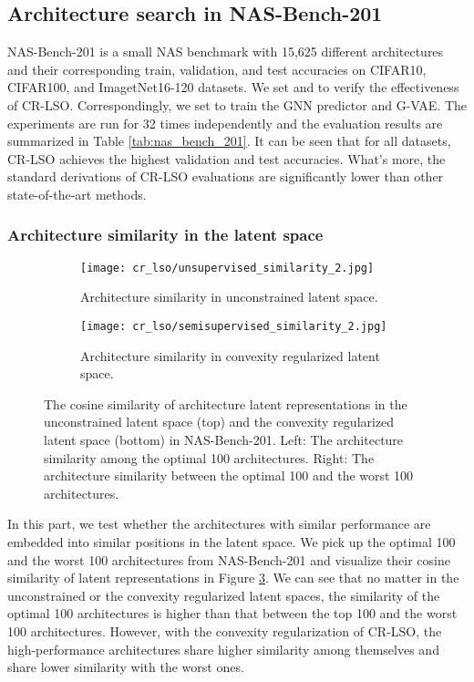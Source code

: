 \documentclass[10pt,twocolumn,letterpaper]{article}
\begin{document}
\subsection{Architecture search in NAS-Bench-201}
NAS-Bench-201 is a small NAS benchmark with 15,625 different architectures and their corresponding train, validation, and test accuracies on CIFAR10, CIFAR100, and ImagetNet16-120 datasets. We set  and  to verify the effectiveness of CR-LSO. Correspondingly, we set  to train the GNN predictor and G-VAE. The experiments are run for 32 times independently and the evaluation results are summarized in Table \ref{tab:nas_bench_201}. It can be seen that for all datasets, CR-LSO achieves the highest validation and test accuracies. What's more, the standard derivations of CR-LSO evaluations are significantly lower than other state-of-the-art methods. 
\subsubsection{Architecture similarity in the latent space}
\begin{figure}
	\centering
	\begin{subfigure}{1.0 \linewidth}
		\texttt{[image: cr\_lso/unsupervised\_similarity\_2.jpg]}
		\caption{Architecture similarity in unconstrained latent space.}
		\label{fig:short-a}
	\end{subfigure}
	\hfill
	\begin{subfigure}{1.0 \linewidth}
		\texttt{[image: cr\_lso/semisupervised\_similarity\_2.jpg]}
		\caption{Architecture similarity in convexity regularized latent space.}
		\label{fig:short-a}
	\end{subfigure}
	\caption{The cosine similarity of architecture latent representations in the unconstrained latent space (top) and the convexity regularized latent space (bottom) in NAS-Bench-201. Left: The architecture similarity among the optimal 100 architectures. Right: The architecture similarity between the optimal 100 and the worst 100 architectures. }
	\label{fig:short}
\end{figure} 
In this part, we test whether the architectures with similar performance are embedded into similar positions in the latent space. We pick up the optimal 100 and the worst 100 architectures from NAS-Bench-201 and visualize their cosine similarity of latent representations in Figure \ref{fig:short}. We can see that no matter in the unconstrained or the convexity regularized latent spaces, the similarity of the optimal 100 architectures is higher than that between the top 100 and the worst 100 architectures. However, with the convexity regularization of CR-LSO, the high-performance architectures share higher similarity among themselves and share lower similarity with the worst ones. 
\end{document}
